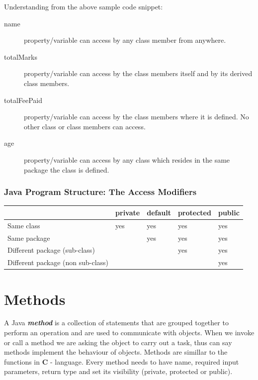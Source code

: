 \documentclass[11pt,a4paper]{article}
\begin{document}
\begin{description}
 \item Understanding from the above sample code snippet:
 \begin{description}
  \item [name] property/variable can access by any class member from anywhere.
  \item [totalMarks] property/variable can access by the class members itself and by its derived class members.
  \item [totalFeePaid] property/variable can access by the class members where it is defined. No other class or class members can access.
  \item [age] property/variable can access by any class which resides in the same package the class is defined.
 \end{description}
\end{description}

\subsubsection*{Java Program Structure: The Access Modifiers}

\begin{tabular}{|l|l|l|l|l|} \hline
 \multicolumn{1}{|c|}{ }  & \multicolumn{1}{|c|}{\textbf{private}} & \multicolumn{1}{|c|}{\textbf{default}} & \multicolumn{1}{|c|}{\textbf{protected}} & \multicolumn{1}{|c|}{\textbf{public}} \\\hline
 Same class & yes & yes & yes & yes \\\hline
 Same package & &  yes & yes & yes \\\hline
 Different package (sub-class) & & & yes & yes \\\hline
 Different package (non sub-class) & & & & yes \\\hline 
\end{tabular}

\section*{Methods}
A Java \emph{\textbf{method}} is a collection of statements that are grouped together to perform an operation and are used to communicate with objects. When we invoke or call a method we are asking the object to carry out a task, thus can say methods implement the behaviour of objects.  Methods are simillar to the functions in \textbf{C} - language. Every method needs to have name, required input parameters, return type and  set its visibility (private, protected or public).
\end{document}
